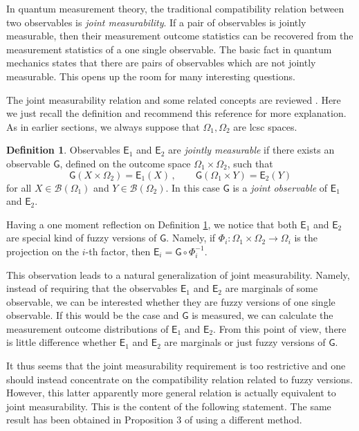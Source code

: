 \documentclass[12pt]{amsart}
\theoremstyle{definition}
\newtheorem{definition}{Definition}
\newcommand{\Eo}{\mathsf{E}} %
\newcommand{\Go}{\mathsf{G}} %
\newcommand{\bor}[1]{\mathcal{B}(#1)} %
\newcommand{\frecc}{\rightarrow}
\begin{document}
In quantum measurement theory, the traditional compatibility relation between two observables is \emph{joint measurability}. If a pair of observables is jointly measurable, then their measurement outcome statistics can be recovered from the measurement statistics of a one single observable. The basic fact in quantum mechanics states that there are pairs of observables which are not jointly measurable. This opens up the room for many interesting questions.

The joint measurability relation and some related concepts are reviewed \cite{Lahti03}.  Here we just recall the definition and recommend this reference for more explanation. As in earlier sections, we always suppose that $\Omega_1 , \Omega_2$ are lcsc spaces.

\begin{definition}\label{def:joint}
Observables $\Eo_1$ and $\Eo_2$ are \emph{jointly measurable} if there exists an observable $\Go$, defined on the outcome space $\Omega_1\times\Omega_2$, such that
\begin{equation*}
\Go(X\times\Omega_2) = \Eo_1(X) \, , \qquad \Go(\Omega_1\times Y) = \Eo_2(Y)
\end{equation*}
for all $X\in\bor{\Omega_1}$ and $Y\in\bor{\Omega_2}$. In this case $\Go$ is a \emph{joint observable} of $\Eo_1$ and $\Eo_2$.
\end{definition}

Having a one moment reflection on Definition \ref{def:joint}, we notice that both $\Eo_1$ and $\Eo_2$ are special kind of fuzzy versions of $\Go$. Namely, if $\Phi_i : \Omega_1 \times \Omega_2 \frecc \Omega_i$ is the projection on the $i$-th factor, then $\Eo_i = \Go \circ \Phi_i^{-1}$.


This observation leads to a natural generalization of joint measurability. Namely, instead of requiring that the observables $\Eo_1$ and $\Eo_2$ are marginals of some observable, we can be interested whether they are fuzzy versions of one single observable. If this would be the case and $\Go$ is measured, we can calculate the measurement outcome distributions of $\Eo_1$ and $\Eo_2$. From this point of view, there is little difference whether  $\Eo_1$ and $\Eo_2$ are marginals or just fuzzy versions of $\Go$.

It thus seems that the joint measurability requirement is too restrictive and one should instead concentrate on the compatibility relation related to fuzzy versions.  However, this latter apparently more general relation is actually equivalent to joint measurability. This is the content of the following statement. The same result has been obtained in Proposition 3 of \cite{Ho85} using a different method.
\end{document}
